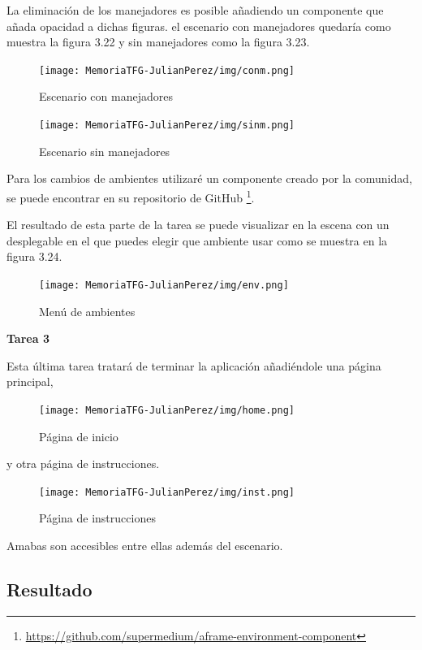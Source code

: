 \documentclass[a4paper, 12pt]{book}
\begin{document}
La eliminación de los manejadores es posible añadiendo un componente que añada opacidad a dichas figuras. el escenario con manejadores quedaría como muestra la figura 3.22 y sin manejadores como la figura 3.23.

\begin{figure}[H]
  \centering
  \begin{minipage}[b]{0.4\textwidth}
 \texttt{[image: MemoriaTFG-JulianPerez/img/conm.png]}
  \caption{Escenario con manejadores}\label{single}
  \end{minipage}
  \hfill
  \begin{minipage}[b]{0.4\textwidth}
  \texttt{[image: MemoriaTFG-JulianPerez/img/sinm.png]}
  \caption{Escenario sin manejadores}\label{scrum}
  \end{minipage}
\end{figure}

Para los cambios de ambientes utilizaré un componente creado por la comunidad, se puede encontrar en su repositorio de GitHub \footnote{\url{https://github.com/supermedium/aframe-environment-component}}. 

El resultado de esta parte de la tarea se puede visualizar en la escena con un desplegable en el que puedes elegir que ambiente usar como se muestra en la figura 3.24.

\begin{figure}[H]
  \centering
  \texttt{[image: MemoriaTFG-JulianPerez/img/env.png]}
  \caption{Menú de ambientes}\label{menu2}
\end{figure}

\textbf{Tarea 3}

Esta última tarea tratará de terminar la aplicación añadiéndole una página principal,

\begin{figure}[H]
  \centering
  \texttt{[image: MemoriaTFG-JulianPerez/img/home.png]}
  \caption{Página de inicio}\label{home}
\end{figure}

y otra página de instrucciones.

\begin{figure}[H]
  \centering
  \texttt{[image: MemoriaTFG-JulianPerez/img/inst.png]}
  \caption{Página de instrucciones}\label{home}
\end{figure}

Amabas son accesibles entre ellas además del escenario.

\subsection{Resultado}
\end{document}
